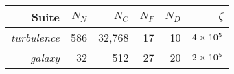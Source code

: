 
\begin{table}[h]
\begin{center}
 
\label{table1}                                                                                                                                                               
\begin{tabular}{rrrrrr}
Suite & $N_N$ & $N_C$ & $N_F$ & $N_D$ & $\zeta$ \\
\hline
\emph{turbulence} & 586 & 32,768 & 17 &10 & $4\times {10^{5}}$\\
\emph{galaxy} & 32 & 512 & 27 & 20 & $2\times {10^{5}}$\\
\hline
\end{tabular}                                                                                                                                                               
\end{center}
\end{table}                                                                                                                                                                

